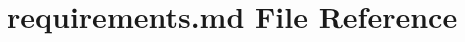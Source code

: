 \hypertarget{requirements_8md}{}\section{requirements.\+md File Reference}
\label{requirements_8md}
